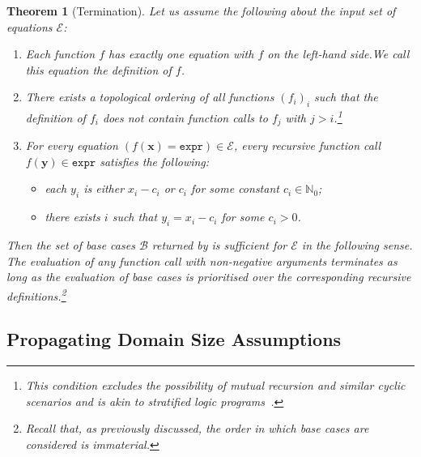 \documentclass{article}
\newtheorem{theorem}{Theorem}
\theoremstyle{definition}
\newcommand{\expr}{\mathtt{expr}}
\begin{document}
\begin{theorem}[Termination]\label{thm:halting}
  Let us assume the following about the input set of equations $\mathcal{E}$:
  \begin{enumerate}
    \item Each function $f$ has exactly one equation with $f$ on the left-hand
          side.\@ We call this equation the \emph{definition} of $f$.
    \item There exists a topological ordering of all functions ${(f_{i})}_{i}$
          such that the definition of $f_{i}$ does not contain function calls to
          $f_{j}$ with $j > i$.\footnote{This condition excludes the possibility
          of mutual recursion and similar cyclic scenarios and is akin to
          stratified logic programs~\cite{DBLP:books/sp/Lloyd87}.}
    \item For every equation $(f(\mathbf{x}) = \expr) \in \mathcal{E}$, every
          recursive function call $f(\mathbf{y}) \in \expr$ satisfies the
          following:
          \begin{itemize}
            \item each $y_{i}$ is either $x_{i} - c_{i}$ or $c_{i}$ for some
                  constant $c_{i} \in \mathbb{N}_{0}$;
            \item there exists $i$ such that $y_{i} = x_{i} - c_{i}$ for some
                  $c_{i} > 0$.
          \end{itemize}
  \end{enumerate}
  Then the set of base cases $\mathcal{B}$ returned by
   is \emph{sufficient} for $\mathcal{E}$ in the
  following sense. The evaluation of any function call with non-negative
  arguments terminates as long as the evaluation of base cases is prioritised
  over the corresponding recursive definitions.\footnote{Recall that, as
    previously discussed, the order in which base cases are considered is
    immaterial.}
\end{theorem}

\subsection{Propagating Domain Size Assumptions}\label{sec:simplifying}
\end{document}
